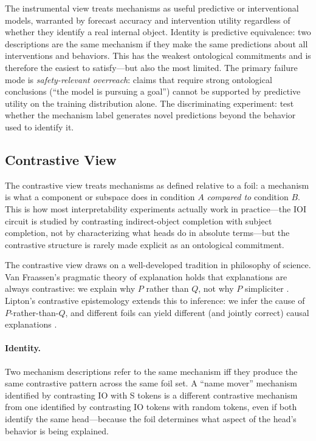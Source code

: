 \documentclass{article}
\begin{document}
The instrumental view treats mechanisms as useful predictive or
interventional models, warranted by forecast accuracy and intervention
utility regardless of whether they identify a real internal object.
Identity is predictive equivalence: two descriptions are the same
mechanism if they make the same predictions about all interventions and
behaviors.  This has the weakest ontological commitments and is therefore
the easiest to satisfy---but also the most limited.  The primary failure
mode is \emph{safety-relevant overreach}: claims that require strong
ontological conclusions (``the model is pursuing a goal'') cannot be
supported by predictive utility on the training distribution alone.
The discriminating experiment: test whether the mechanism label generates
novel predictions beyond the behavior used to identify it.

\subsection{Contrastive View}

The contrastive view treats mechanisms as defined relative to a foil:
a mechanism is what a component or subspace does in condition $A$
\emph{compared to} condition $B$.  This is how most interpretability
experiments actually work in practice---the IOI circuit is studied by
contrasting indirect-object completion with subject completion, not by
characterizing what heads do in absolute terms---but the contrastive
structure is rarely made explicit as an ontological commitment.

The contrastive view draws on a well-developed tradition in philosophy
of science.  Van Fraassen's pragmatic theory of explanation holds that
explanations are always contrastive: we explain why $P$ rather than $Q$,
not why $P$ simpliciter \citep{vanfraassen1980}.  Lipton's contrastive
epistemology extends this to inference: we infer the cause of $P$-rather-than-$Q$,
and different foils can yield different (and jointly correct) causal
explanations \citep{lipton1990}.

\paragraph{Identity.}
Two mechanism descriptions refer to the same mechanism iff they produce
the same contrastive pattern across the same foil set.  A ``name mover''
mechanism identified by contrasting IO with S tokens is a different
contrastive mechanism from one identified by contrasting IO tokens with
random tokens, even if both identify the same head---because the foil
determines what aspect of the head's behavior is being explained.
\end{document}
